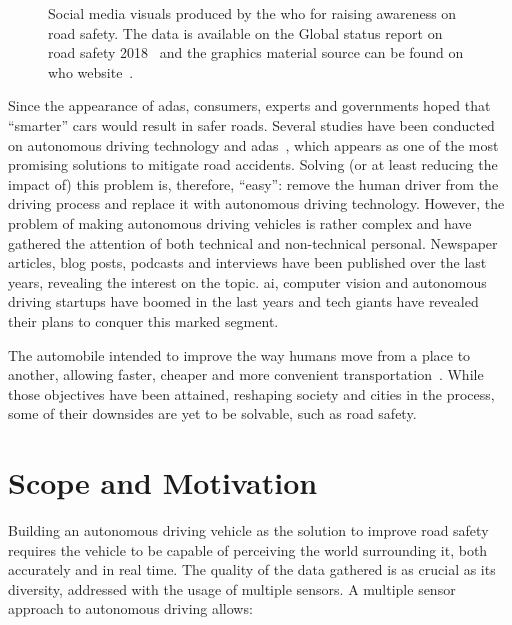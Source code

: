 \begin{figure}[H]
\begin{subfigure}[c]{0.3\textwidth}
		\label{fig:test_image_5}
	\end{subfigure}
	\caption{Social media visuals produced by the \acf{who} for raising awareness on road safety. The data is available on the Global status report on road safety 2018~\cite{WHO2018} and the graphics material source can be found on \ac{who} website~\cite{WHOsite}.}
	\label{fig:test_image}
\end{figure}

Since the appearance of \ac{adas}, consumers, experts and governments hoped that ``smarter'' cars would result in safer roads. Several studies have been conducted on autonomous driving technology and \ac{adas}~\cite{Fridman2017, ADAS1, Bimbraw2015}, which appears as one of the most promising solutions to mitigate road accidents. Solving (or at least reducing the impact of) this problem is, therefore, ``easy'': remove the human driver from the driving process and replace it with autonomous driving technology. However, the problem of making autonomous driving vehicles  is rather complex and have gathered the attention of both technical and non-technical personal. Newspaper articles, blog posts, podcasts and interviews have been published over the last years, revealing the interest on the topic. \ac{ai}, computer vision and autonomous driving startups have boomed in the last years and tech giants have revealed their plans to conquer this marked segment.

The automobile intended to improve the way humans move from a place to another, allowing faster, cheaper and more convenient transportation~\cite{Setright2003, DailyNews2013}. While those objectives have been attained, reshaping society and cities in the process, some of their downsides are yet to be solvable, such as road safety.


\section{Scope and Motivation}
\label{sec:introduction:scope_motivation}
Building an autonomous driving vehicle as the solution to improve road safety requires the vehicle
to be capable of perceiving the world surrounding it, both accurately and in real time. The quality
of the data gathered is as crucial as its diversity, addressed with the usage of multiple sensors. A multiple sensor approach to autonomous driving allows:

